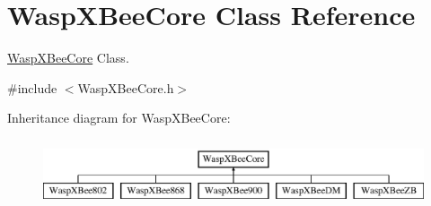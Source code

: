 \hypertarget{class_wasp_x_bee_core}{}\section{Wasp\+X\+Bee\+Core Class Reference}
\label{class_wasp_x_bee_core}


\hyperlink{class_wasp_x_bee_core}{Wasp\+X\+Bee\+Core} Class.  




{\ttfamily \#include $<$Wasp\+X\+Bee\+Core.\+h$>$}

Inheritance diagram for Wasp\+X\+Bee\+Core\+:\begin{figure}[H]
\begin{center}
\leavevmode
\includegraphics[height=2.000000cm]{class_wasp_x_bee_core}
\end{center}
\end{figure}
